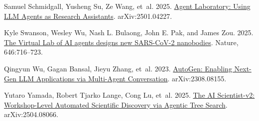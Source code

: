 \documentclass[11pt]{article}
\begin{document}
\begin{thebibliography}{}
Samuel Schmidgall, Yusheng Su, Ze Wang, et~al. 2025.
\newblock \href{https://arxiv.org/abs/2501.04227}{Agent Laboratory: Using LLM Agents as Research Assistants}.
\newblock arXiv:2501.04227.

Kyle Swanson, Wesley Wu, Nash L. Bulaong, John E. Pak, and James Zou. 2025.
\newblock \href{https://doi.org/10.1038/s41586-025-09442-9}{The Virtual Lab of AI agents designs new SARS-CoV-2 nanobodies}.
\newblock Nature, 646:716--723.

Qingyun Wu, Gagan Bansal, Jieyu Zhang, et~al. 2023.
\newblock \href{https://arxiv.org/abs/2308.08155}{AutoGen: Enabling Next-Gen LLM Applications via Multi-Agent Conversation}.
\newblock arXiv:2308.08155.

Yutaro Yamada, Robert Tjarko Lange, Cong Lu, et~al. 2025.
\newblock \href{https://arxiv.org/abs/2504.08066}{The AI Scientist-v2: Workshop-Level Automated Scientific Discovery via Agentic Tree Search}.
\newblock arXiv:2504.08066.

\end{thebibliography}
\end{document}
